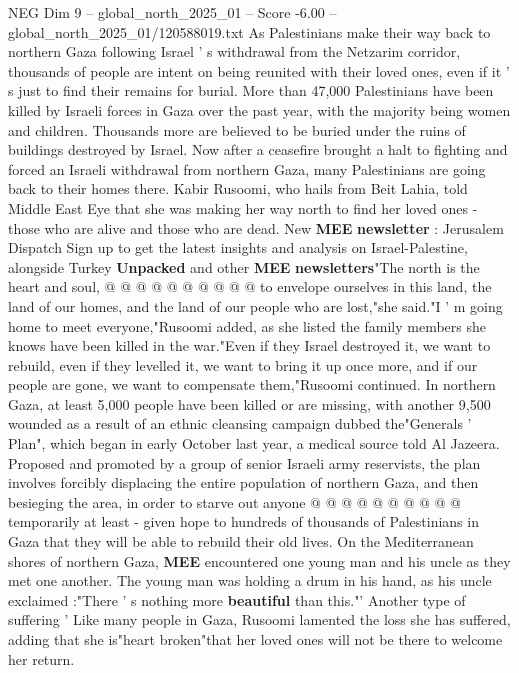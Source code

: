 \begin{textsample}{NEG Dim 9 – global\_north\_2025\_01 – Score -6.00 – global\_north\_2025\_01/120588019.txt}  \label{ex:f9_neg_097}
As Palestinians make their way back to northern Gaza following Israel ' s withdrawal from the Netzarim corridor, thousands of people are intent on being reunited with their loved ones, even if it ' s just to find their remains for burial.
More than 47,000 Palestinians have been killed by Israeli forces in Gaza over the past year, with the majority being women and children.
Thousands more are believed to be buried under the ruins of buildings destroyed by Israel.
Now after a ceasefire brought a halt to fighting and forced an Israeli withdrawal from northern Gaza, many Palestinians are going back to their homes there.
Kabir Rusoomi, who hails from Beit Lahia, told Middle East Eye that she was making her way north to find her loved ones - those who are alive and those who are dead.
New \textbf{MEE} \textbf{newsletter} : Jerusalem Dispatch Sign up to get the latest insights and analysis on Israel-Palestine, alongside Turkey \textbf{Unpacked} and other \textbf{MEE} \textbf{newsletters}"The north is the heart and soul, @ @ @ @ @ @ @ @ @ @ to envelope ourselves in this land, the land of our homes, and the land of our people who are lost,"she said."I ' m going home to meet everyone,"Rusoomi added, as she listed the family members she knows have been killed in the war."Even if they Israel destroyed it, we want to rebuild, even if they levelled it, we want to bring it up once more, and if our people are gone, we want to compensate them,"Rusoomi continued.
In northern Gaza, at least 5,000 people have been killed or are missing, with another 9,500 wounded as a result of an ethnic cleansing campaign dubbed the"Generals ' Plan", which began in early October last year, a medical source told Al Jazeera.
Proposed and promoted by a group of senior Israeli army reservists, the plan involves forcibly displacing the entire population of northern Gaza, and then besieging the area, in order to starve out anyone @ @ @ @ @ @ @ @ @ @ temporarily at least - given hope to hundreds of thousands of Palestinians in Gaza that they will be able to rebuild their old lives.
On the Mediterranean shores of northern Gaza, \textbf{MEE} encountered one young man and his uncle as they met one another.
The young man was holding a drum in his hand, as his uncle exclaimed :"There ' s nothing more \textbf{beautiful} than this."' Another type of suffering ' Like many people in Gaza, Rusoomi lamented the loss she has suffered, adding that she is"heart broken"that her loved ones will not be there to welcome her return.

\end{textsample}
